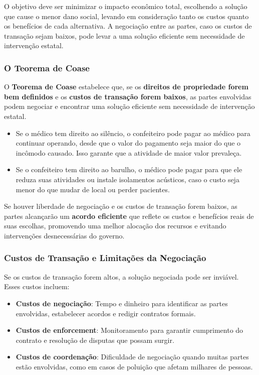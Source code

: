 \documentclass[a4paper,12pt]{article}[abntex2]
\begin{document}
O objetivo deve ser minimizar o impacto econômico total, escolhendo a solução que cause o menor dano social, levando em consideração tanto os custos quanto os benefícios de cada alternativa. A negociação entre as partes, caso os custos de transação sejam baixos, pode levar a uma solução eficiente sem necessidade de intervenção estatal.

\subsubsection{O Teorema de Coase}

O \textbf{Teorema de Coase} estabelece que, se os \textbf{direitos de propriedade forem bem definidos} e os \textbf{custos de transação forem baixos}, as partes envolvidas podem negociar e encontrar uma solução eficiente sem necessidade de intervenção estatal.

\begin{itemize}
    \item Se o médico tem direito ao silêncio, o confeiteiro pode pagar ao médico para continuar operando, desde que o valor do pagamento seja maior do que o incômodo causado. Isso garante que a atividade de maior valor prevaleça.
    \item Se o confeiteiro tem direito ao barulho, o médico pode pagar para que ele reduza suas atividades ou instale isolamentos acústicos, caso o custo seja menor do que mudar de local ou perder pacientes.
\end{itemize}

Se houver liberdade de negociação e os custos de transação forem baixos, as partes alcançarão um \textbf{acordo eficiente} que reflete os custos e benefícios reais de suas escolhas, promovendo uma melhor alocação dos recursos e evitando intervenções desnecessárias do governo.

\subsubsection{Custos de Transação e Limitações da Negociação}

Se os custos de transação forem altos, a solução negociada pode ser inviável. Esses custos incluem:

\begin{itemize}
    \item \textbf{Custos de negociação}: Tempo e dinheiro para identificar as partes envolvidas, estabelecer acordos e redigir contratos formais.
    \item \textbf{Custos de enforcement}: Monitoramento para garantir cumprimento do contrato e resolução de disputas que possam surgir.
    \item \textbf{Custos de coordenação}: Dificuldade de negociação quando muitas partes estão envolvidas, como em casos de poluição que afetam milhares de pessoas.
\end{itemize}
\end{document}
